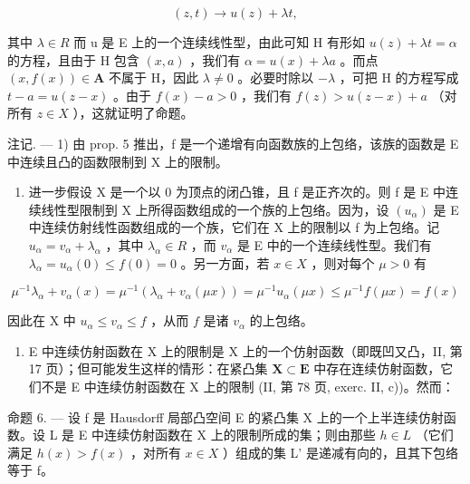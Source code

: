\[
(z, t) \rightarrow u (z) + \lambda t,
\]

其中 \(\lambda\in R\) 而 u 是 E 上的一个连续线性型，由此可知 H 有形如 \(u(z)+\lambda t=\alpha\) 的方程，且由于 H 包含 \((x,a)\) ，我们有 \(\alpha=u(x)+\lambda a\) 。而点 \((x,f(x))\in\mathbf{A}\) 不属于 H，因此 \(\lambda\neq0\) 。必要时除以 \(-\lambda\) ，可把 H 的方程写成 \(t-a=u(z-x)\) 。由于 \(f(x)-a>0\) ，我们有 \(f(z)>u(z-x)+a\) （对所有 \(z\in X\) ），这就证明了命题。

注记. --- 1) 由 prop. 5 推出，f 是一个递增有向函数族的上包络，该族的函数是 E 中连续且凸的函数限制到 X 上的限制。

\begin{enumerate}
\def\labelenumi{\arabic{enumi})}
\setcounter{enumi}{1}
\tightlist
\item
  进一步假设 X 是一个以 0 为顶点的闭凸锥，且 f 是正齐次的。则 f 是 E 中连续线性型限制到 X 上所得函数组成的一个族的上包络。因为，设 \((u_{\alpha})\) 是 E 中连续仿射线性函数组成的一个族，它们在 X 上的限制以 f 为上包络。记 \(u_{\alpha} = v_{\alpha} + \lambda_{\alpha}\) ，其中 \(\lambda_{\alpha} \in R\) ，而 \(v_{\alpha}\) 是 E 中的一个连续线性型。我们有 \(\lambda_{\alpha} = u_{\alpha}(0) \leqslant f(0) = 0\) 。另一方面，若 \(x \in X\) ，则对每个 \(\mu > 0\) 有
\end{enumerate}

\[
\mu^ {- 1} \lambda_ {\alpha} + v _ {\alpha} (x) = \mu^ {- 1} (\lambda_ {\alpha} + v _ {\alpha} (\mu x)) = \mu^ {- 1} u _ {\alpha} (\mu x) \leqslant \mu^ {- 1} f (\mu x) = f (x)
\]

因此在 X 中 \(u_{\alpha} \leqslant v_{\alpha} \leqslant f\) ，从而 \(f\) 是诸 \(v_{\alpha}\) 的上包络。

\begin{enumerate}
\def\labelenumi{\arabic{enumi})}
\setcounter{enumi}{2}
\tightlist
\item
  E 中连续仿射函数在 X 上的限制是 X 上的一个仿射函数（即既凹又凸，II, 第 17 页）；但可能发生这样的情形：在紧凸集 \(\mathbf{X} \subset \mathbf{E}\) 中存在连续仿射函数，它们不是 E 中连续仿射函数在 X 上的限制 (II, 第 78 页, exerc. II, c))。然而：
\end{enumerate}

命题 6. --- 设 f 是 Hausdorff 局部凸空间 E 的紧凸集 X 上的一个上半连续仿射函数。设 L 是 E 中连续仿射函数在 X 上的限制所成的集；则由那些 \(h \in L\) （它们满足 \(h(x) > f(x)\) ，对所有 \(x \in X\) ）组成的集 L' 是递减有向的，且其下包络等于 f。

